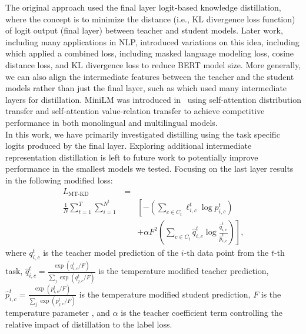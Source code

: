 The original approach used the final layer logit-based knowledge distillation, where the concept is to minimize the distance (i.e., KL divergence loss function) of logit output (final layer) between teacher and student models. 
Later work, including many applications in NLP, introduced variations on this idea, including \cite{sanh2019distilbert} which applied a combined loss, including masked language modeling loss, cosine distance loss, and KL divergence loss to reduce BERT model size.
More generally, we can also align the intermediate features between the teacher and the student models rather than just the final layer, such as \cite{jiao2020tinybert} which used many intermediate layers for distillation.
MiniLM was introduced in~\cite{wang2020minilm} using self-attention distribution transfer and self-attention value-relation transfer to achieve competitive performance in both monolingual and multilingual models. \\

In this work, we have primarily investigated distilling using the task specific logits produced by the final layer.
Exploring additional intermediate representation distillation is left to future work to potentially improve performance in the smallest models we tested.
Focusing on the last layer results in the following modified loss:
\begin{eqnarray}
L_{\mbox{MT-KD}} &=& \nonumber \\
 \frac{1}{N} \sum_{t=1}^T \sum_{i=1}^{N^t} &&\left[ - \left( \sum_{c \in C_{t}} \ell_{i,c}^t \log p_{i,c}^t \right) \right. \nonumber \\
&& \left. + \alpha F^2 \left( \sum_{c \in C_{t}} \hat{q}_{i,c}^t \log \frac{\hat{q}_{i,c}^t}{\hat{p}_{i,c}^t} \right)  \right],
\end{eqnarray}
where $q_{i,c}^t$ is the teacher model prediction of the $i$-th data point from the $t$-th task, $\hat{q}_{i,c}^t = \frac{\exp(q_{i,c}^t/F)}{ \sum_j \exp(q_{j,c}^t/F)}$ is the temperature modified teacher prediction, $\hat{p}_{i,c}^t = \frac{\exp(p_{i,c}^t/F)}{ \sum_j \exp(p_{j,c}^t/F)}$ is the temperature modified student prediction, $F$ is the temperature parameter \cite{hinton2015distilling}, and $\alpha$ is the teacher coefficient term controlling the relative impact of distillation to the label loss.

